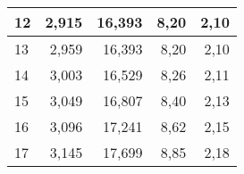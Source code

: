 {\begin{center}
\begin{tabular}{|l|r|r|r|r|}
12 & 2,915                                                                            & 16,393                                                                                                                         & 8,20                                                                                                                                             & 2,10                                           \\ \hline
13 & 2,959                                                                            & 16,393                                                                                                                         & 8,20                                                                                                                                             & 2,10                                           \\ \hline
14 & 3,003                                                                            & 16,529                                                                                                                         & 8,26                                                                                                                                             & 2,11                                           \\ \hline
15 & 3,049                                                                            & 16,807                                                                                                                         & 8,40                                                                                                                                             & 2,13                                           \\ \hline
16 & 3,096                                                                            & 17,241                                                                                                                         & 8,62                                                                                                                                             & 2,15                                           \\ \hline
17 & 3,145                                                                            & 17,699                                                                                                                         & 8,85                                                                                                                                             & 2,18                                           \\ \hline

\end{tabular}
\end{center}}
